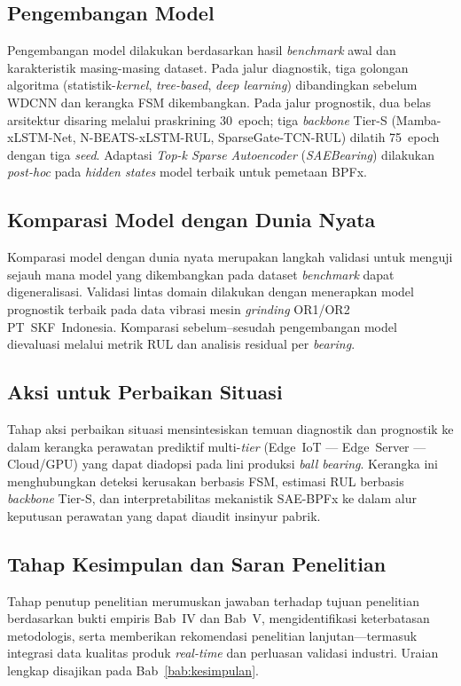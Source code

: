 {\color{blue}
\subsection{Pengembangan Model}
\label{subsec:bab1_pengembangan_model}

Pengembangan model dilakukan berdasarkan hasil \emph{benchmark} awal dan
karakteristik masing-masing dataset.
Pada jalur diagnostik, tiga golongan algoritma (statistik-\emph{kernel},
\emph{tree-based}, \emph{deep learning}) dibandingkan sebelum WDCNN dan
kerangka FSM dikembangkan.
Pada jalur prognostik, dua belas arsitektur disaring melalui praskrining
30~epoch; tiga \emph{backbone} Tier-S (Mamba-xLSTM-Net, N-BEATS-xLSTM-RUL,
SparseGate-TCN-RUL) dilatih 75~epoch dengan tiga \emph{seed}.
Adaptasi \emph{Top-k Sparse Autoencoder} (\emph{SAEBearing}) dilakukan
\emph{post-hoc} pada \emph{hidden states} model terbaik untuk pemetaan
BPFx.
}

{\color{blue}
\subsection{Komparasi Model dengan Dunia Nyata}
\label{subsec:bab1_komparasi_dunia_nyata}

Komparasi model dengan dunia nyata merupakan langkah validasi untuk
menguji sejauh mana model yang dikembangkan pada dataset \emph{benchmark}
dapat digeneralisasi.
Validasi lintas domain dilakukan dengan menerapkan model prognostik terbaik
pada data vibrasi mesin \emph{grinding} OR1/OR2 PT~SKF~Indonesia.
Komparasi sebelum--sesudah pengembangan model dievaluasi melalui metrik
RUL dan analisis residual per \emph{bearing}.
}

{\color{blue}
\subsection{Aksi untuk Perbaikan Situasi}
\label{subsec:bab1_aksi_perbaikan}

Tahap aksi perbaikan situasi mensintesiskan temuan diagnostik dan
prognostik ke dalam kerangka perawatan prediktif multi-\emph{tier}
(Edge~IoT --- Edge~Server --- Cloud/GPU) yang dapat diadopsi pada
lini produksi \emph{ball bearing}.
Kerangka ini menghubungkan deteksi kerusakan berbasis FSM, estimasi RUL
berbasis \emph{backbone} Tier-S, dan interpretabilitas mekanistik
SAE-BPFx ke dalam alur keputusan perawatan yang dapat diaudit insinyur
pabrik.
}

{\color{blue}
\subsection{Tahap Kesimpulan dan Saran Penelitian}
\label{subsec:bab1_tahap_kesimpulan}

Tahap penutup penelitian merumuskan jawaban terhadap tujuan penelitian
berdasarkan bukti empiris Bab~IV dan Bab~V, mengidentifikasi
keterbatasan metodologis, serta memberikan rekomendasi penelitian
lanjutan---termasuk integrasi data kualitas produk \emph{real-time} dan
perluasan validasi industri.
Uraian lengkap disajikan pada Bab~\ref{bab:kesimpulan}.
}

